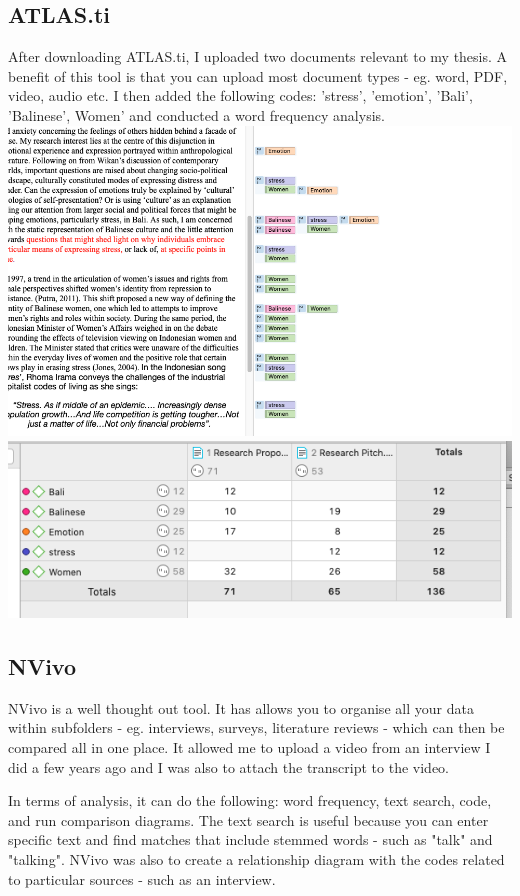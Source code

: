 \documentclass{article}
\begin{document}
\subsection{ATLAS.ti}
After downloading ATLAS.ti, I uploaded two documents relevant to my thesis. A benefit of this tool is that you can upload most document types - eg. word, PDF, video, audio etc. I then added the following codes: 'stress', 'emotion', 'Bali', 'Balinese', Women' and conducted a word frequency analysis.  
\includegraphics[width=\textwidth]{ATLAS.png}
\includegraphics[width=\textwidth]{ATLAS2.png}

\subsection{NVivo}
NVivo is a well thought out tool. It has allows you to organise all your data within subfolders - eg. interviews, surveys, literature reviews - which can then be compared all in one place. It allowed me to upload a video from an interview I did a few years ago and I was also to attach the transcript to the video. 

In terms of analysis, it can do the following: word frequency, text search, code, and run comparison diagrams. The text search is useful because you can enter specific text and find matches that include stemmed words - such as "talk" and "talking". NVivo was also to create a relationship diagram with the codes related to particular sources - such as an interview. 
\end{document}
